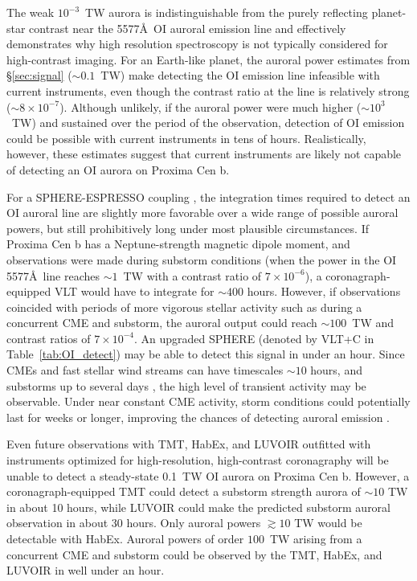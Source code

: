 \documentclass{emulateapj}
\begin{document}
The weak $10^{-3}$~TW aurora is indistinguishable from the purely reflecting planet-star contrast near the 5577\AA\ OI auroral emission line \citep{Turbet2016,Meadows2016} and effectively demonstrates why high resolution spectroscopy is not typically considered for high-contrast imaging.
For an Earth-like planet, the auroral power estimates from \S\ref{sec:signal} (${\sim} 0.1$~TW) make detecting the OI emission line infeasible with current instruments, even though the contrast ratio at the line is relatively strong (${\sim}8 \times 10^{-7}$). 
Although unlikely, if the auroral power were much higher (${\sim} 10^{3}$~TW) and sustained over the period of the observation, detection of OI emission could be possible with current instruments in tens of hours.
Realistically, however, these estimates suggest that current instruments are likely not capable of detecting an OI aurora on Proxima Cen b.

For a SPHERE-ESPRESSO coupling \citep{Lovis2016}, the integration times required to detect an OI auroral line are slightly more favorable over a wide range of possible auroral powers, but still prohibitively long under most plausible circumstances. If Proxima Cen b has a Neptune-strength magnetic dipole moment, and observations were made during substorm conditions (when the power in the OI 5577\AA\ line reaches ${\sim} 1$~TW with a contrast ratio of $7 \times 10^{-6}$), a coronagraph-equipped VLT would have to integrate for ${\sim} 400$ hours. However, if observations coincided with periods of more vigorous stellar activity such as during a concurrent CME and substorm, the auroral output could reach ${\sim} 100$~TW and contrast ratios of $7 \times 10^{-4}$.  An upgraded SPHERE (denoted by VLT+C in Table~\ref{tab:OI_detect}) may be able to detect this signal in under an hour. Since CMEs and fast stellar wind streams can have timescales ${\sim} 10$ hours, and substorms up to several days \citep{Gonzalez1994,Gonzalez1999}, the high level of transient activity may be observable.  Under near constant CME activity, storm conditions could potentially last for weeks or longer, improving the chances of detecting auroral emission  \citep{Khodachenko2007}.

Even future observations with TMT, HabEx, and LUVOIR outfitted with instruments optimized for high-resolution, high-contrast coronagraphy will be unable to detect a steady-state 0.1~TW OI aurora on Proxima Cen b. However, a coronagraph-equipped TMT could detect a substorm strength aurora of ${\sim} 10$ TW in about 10 hours, while LUVOIR could make the predicted substorm auroral observation in about 30 hours. Only auroral powers ${\gtrsim}10$ TW would be detectable with HabEx.
Auroral powers of order $100$~TW arising from a concurrent CME and substorm could be observed by the TMT, HabEx, and LUVOIR in well under an hour.
\end{document}
